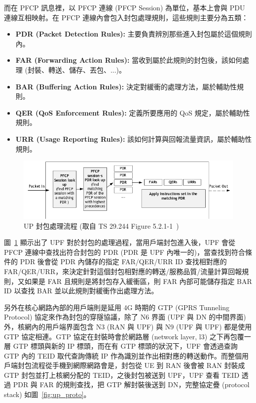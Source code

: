 而在 PFCP 訊息裡，以 PFCP 連線 (PFCP Session) 為單位，基本上會與 PDU 連線互相映射。在 PFCP 連線內會包入封包處理規則，這些規則主要分為五類：
\begin{itemize}
\item \textbf{PDR (Packet Detection Rules):} 主要負責辨別那些進入封包屬於這個規則內。
\item \textbf{FAR (Forwarding Action Rules):} 當收到屬於此規則的封包後，該如何處理 (封裝、轉送、儲存、丟包、...)。
\item \textbf{BAR (Buffering Action Rules):} 決定對緩衝的處理方法，屬於輔助性規則。
\item \textbf{QER (QoS Enforcement Rules):} 定義所要應用的 QoS 規定，屬於輔助性規則。
\item \textbf{URR (Usage Reporting Rules):} 該如何計算與回報流量資訊，屬於輔助性規則。
\end{itemize}

\begin{figure}[htbp]
    \centering
    \includegraphics[height=!,width=1\linewidth,keepaspectratio=true]{figures/29_244_5-2-1-1_pack_proc_flow}
    \caption[UP 封包處理流程]{{\footnotesize UP 封包處理流程 (取自 TS 29.244 Figure 5.2.1-1~\cite{3gpp.29.244})}}
    \label{fig:up_pack_proc_flow}
\end{figure}

圖~\ref{fig:up_pack_proc_flow} 顯示出了 UPF 對於封包的處理過程，當用戶端封包進入後，UPF 會從 PFCP 連線中查找出符合封包的 PDR (PDR 是 UPF 內唯一的)，當查找到符合條件的 PDR 後會從 PDR 內儲存的指定 FAR/QER/URR ID 查找相對應的 FAR/QER/URR，來決定針對這個封包相對應的轉送/服務品質/流量計算回報規則，又如果是 FAR 且規則是將封包存入緩衝區，則 FAR 內部可能儲存指定 BAR ID 以查找 BAR 並以此規則對緩衝作出處理方法。

另外在核心網路內部的用戶端則是延用 4G 時期的 GTP (GPRS Tunneling Protocol) 協定來作為封包的穿隧協議，除了 N6 界面 (UPF 與 DN 的中間界面) 外，核網內的用戶端界面包含 N3 (RAN 與 UPF) 與 N9 (UPF 與 UPF) 都是使用 GTP 協定相連。GTP 協定在封裝時會於網路層 (network layer, l3) 之下再包覆一層 GTP 標頭與新的 IP 標頭，而在有 GTP 標頭的狀況下，UPF 會透過查詢 GTP 內的 TEID 取代查詢傳統 IP 作為識別並作出相對應的轉送動作。而整個用戶端封包流程從手機到網際網路會是，封包從 UE 到 RAN 後會被 RAN 封裝成 GTP 封包並打上核網分配的 TEID，之後封包被送到 UPF，UPF 查看 TEID 透過 PDR 與 FAR 的規則查找，把 GTP 解封裝後送到 DN，完整協定疊 (protocol stack) 如圖~\ref{fig:up_proto}。

